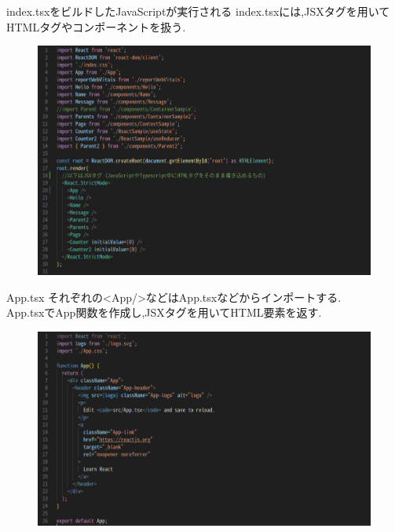 \documentclass[aspectratio=169]{beamer}
\begin{document}
\begin{frame}{index.tsxをビルドしたJavaScriptが実行される}
    index.tsxには,JSXタグを用いてHTMLタグやコンポーネントを扱う.
    \begin{figure}
        \centering
        \includegraphics[scale = 0.25]{index_tsx.png}
    \end{figure}
\end{frame}  

\begin{frame}{App.tsx}
    それぞれの<App/>などはApp.tsxなどからインポートする.\\
    App.tsxでApp関数を作成し,JSXタグを用いてHTML要素を返す.
    \begin{figure}
        \centering
       \includegraphics[scale = 0.3]{App_tsx.png}
    \end{figure}
\end{frame}  
\end{document}
